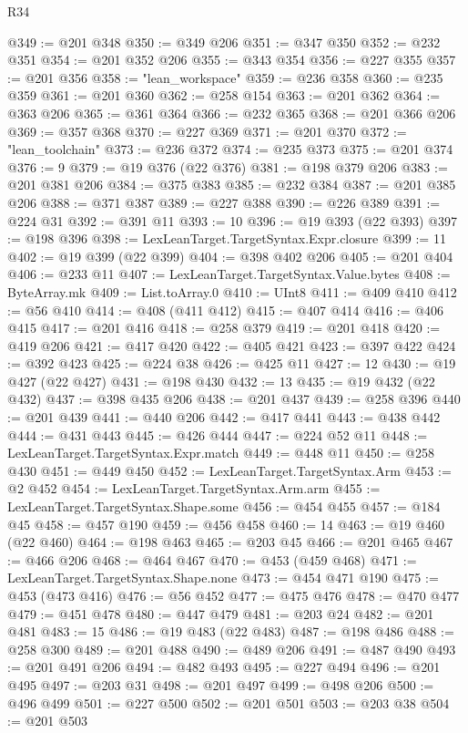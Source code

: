 \begin{lexlean}{R34}
\begin{coremodule}
@349 := @201 @348
@350 := @349 @206
@351 := @347 @350
@352 := @232 @351
@354 := @201 @352 @206
@355 := @343 @354
@356 := @227 @355
@357 := @201 @356
@358 := "lean_workspace"
@359 := @236 @358
@360 := @235 @359
@361 := @201 @360
@362 := @258 @154
@363 := @201 @362
@364 := @363 @206
@365 := @361 @364
@366 := @232 @365
@368 := @201 @366 @206
@369 := @357 @368
@370 := @227 @369
@371 := @201 @370
@372 := "lean_toolchain"
@373 := @236 @372
@374 := @235 @373
@375 := @201 @374
@376 := 9
@379 := @19 @376 (@22 @376)
@381 := @198 @379 @206
@383 := @201 @381 @206
@384 := @375 @383
@385 := @232 @384
@387 := @201 @385 @206
@388 := @371 @387
@389 := @227 @388
@390 := @226 @389
@391 := @224 @31
@392 := @391 @11
@393 := 10
@396 := @19 @393 (@22 @393)
@397 := @198 @396
@398 := LexLeanTarget.TargetSyntax.Expr.closure
@399 := 11
@402 := @19 @399 (@22 @399)
@404 := @398 @402 @206
@405 := @201 @404
@406 := @233 @11
@407 := LexLeanTarget.TargetSyntax.Value.bytes
@408 := ByteArray.mk
@409 := List.toArray.{0}
@410 := UInt8
@411 := @409 @410
@412 := @56 @410
@414 := @408 (@411 @412)
@415 := @407 @414
@416 := @406 @415
@417 := @201 @416
@418 := @258 @379
@419 := @201 @418
@420 := @419 @206
@421 := @417 @420
@422 := @405 @421
@423 := @397 @422
@424 := @392 @423
@425 := @224 @38
@426 := @425 @11
@427 := 12
@430 := @19 @427 (@22 @427)
@431 := @198 @430
@432 := 13
@435 := @19 @432 (@22 @432)
@437 := @398 @435 @206
@438 := @201 @437
@439 := @258 @396
@440 := @201 @439
@441 := @440 @206
@442 := @417 @441
@443 := @438 @442
@444 := @431 @443
@445 := @426 @444
@447 := @224 @52 @11
@448 := LexLeanTarget.TargetSyntax.Expr.match
@449 := @448 @11
@450 := @258 @430
@451 := @449 @450
@452 := LexLeanTarget.TargetSyntax.Arm
@453 := @2 @452
@454 := LexLeanTarget.TargetSyntax.Arm.arm
@455 := LexLeanTarget.TargetSyntax.Shape.some
@456 := @454 @455
@457 := @184 @45
@458 := @457 @190
@459 := @456 @458
@460 := 14
@463 := @19 @460 (@22 @460)
@464 := @198 @463
@465 := @203 @45
@466 := @201 @465
@467 := @466 @206
@468 := @464 @467
@470 := @453 (@459 @468)
@471 := LexLeanTarget.TargetSyntax.Shape.none
@473 := @454 @471 @190
@475 := @453 (@473 @416)
@476 := @56 @452
@477 := @475 @476
@478 := @470 @477
@479 := @451 @478
@480 := @447 @479
@481 := @203 @24
@482 := @201 @481
@483 := 15
@486 := @19 @483 (@22 @483)
@487 := @198 @486
@488 := @258 @300
@489 := @201 @488
@490 := @489 @206
@491 := @487 @490
@493 := @201 @491 @206
@494 := @482 @493
@495 := @227 @494
@496 := @201 @495
@497 := @203 @31
@498 := @201 @497
@499 := @498 @206
@500 := @496 @499
@501 := @227 @500
@502 := @201 @501
@503 := @203 @38
@504 := @201 @503

\end{coremodule}
\end{lexlean}
